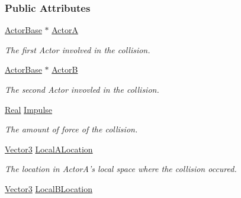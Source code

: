\subsubsection*{Public Attributes}
\begin{DoxyCompactItemize}
\item 
\hypertarget{classphys_1_1EventCollision_a2de905d0332c66293cbe990fe2dbbb07}{
\hyperlink{classphys_1_1ActorBase}{ActorBase} $\ast$ \hyperlink{classphys_1_1EventCollision_a2de905d0332c66293cbe990fe2dbbb07}{ActorA}}
\label{classphys_1_1EventCollision_a2de905d0332c66293cbe990fe2dbbb07}

\begin{DoxyCompactList}\small\item\em The first Actor involved in the collision. \item\end{DoxyCompactList}\item 
\hypertarget{classphys_1_1EventCollision_a922fd42b74db6df7a59cb5fd54cbadbe}{
\hyperlink{classphys_1_1ActorBase}{ActorBase} $\ast$ \hyperlink{classphys_1_1EventCollision_a922fd42b74db6df7a59cb5fd54cbadbe}{ActorB}}
\label{classphys_1_1EventCollision_a922fd42b74db6df7a59cb5fd54cbadbe}

\begin{DoxyCompactList}\small\item\em The second Actor invovled in the collision. \item\end{DoxyCompactList}\item 
\hypertarget{classphys_1_1EventCollision_a577552db818f54a4092baccf597823a2}{
\hyperlink{namespacephys_af7eb897198d265b8e868f45240230d5f}{Real} \hyperlink{classphys_1_1EventCollision_a577552db818f54a4092baccf597823a2}{Impulse}}
\label{classphys_1_1EventCollision_a577552db818f54a4092baccf597823a2}

\begin{DoxyCompactList}\small\item\em The amount of force of the collision. \item\end{DoxyCompactList}\item 
\hypertarget{classphys_1_1EventCollision_a2fa146b8453d2f504abcd5055d2c2a90}{
\hyperlink{classphys_1_1Vector3}{Vector3} \hyperlink{classphys_1_1EventCollision_a2fa146b8453d2f504abcd5055d2c2a90}{LocalALocation}}
\label{classphys_1_1EventCollision_a2fa146b8453d2f504abcd5055d2c2a90}

\begin{DoxyCompactList}\small\item\em The location in ActorA's local space where the collision occured. \item\end{DoxyCompactList}\item 
\hypertarget{classphys_1_1EventCollision_a50d6df6b25532530cd296353ac0b55c6}{
\hyperlink{classphys_1_1Vector3}{Vector3} \hyperlink{classphys_1_1EventCollision_a50d6df6b25532530cd296353ac0b55c6}{LocalBLocation}}
\label{classphys_1_1EventCollision_a50d6df6b25532530cd296353ac0b55c6}


\end{DoxyCompactItemize}
